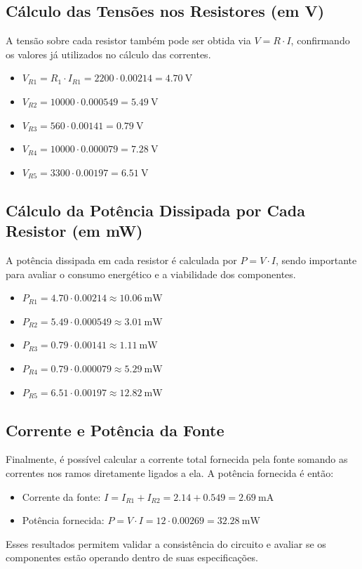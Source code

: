 \subsection{Cálculo das Tensões nos Resistores (em V)}

A tensão sobre cada resistor também pode ser obtida via \(V = R \cdot I\),
confirmando os valores já utilizados no cálculo das correntes.

\begin{itemize}
  \item \(V_{R1} = R_1 \cdot I_{R1} = 2200 \cdot 0.00214 = \SI{4.70}{\volt}\)
  \item \(V_{R2} = 10000 \cdot 0.000549 = \SI{5.49}{\volt}\)
  \item \(V_{R3} = 560 \cdot 0.00141 = \SI{0.79}{\volt}\)
  \item \(V_{R4} = 10000 \cdot 0.000079 = \SI{7.28}{\volt}\)
  \item \(V_{R5} = 3300 \cdot 0.00197 = \SI{6.51}{\volt}\)
\end{itemize}

\subsection{Cálculo da Potência Dissipada por Cada Resistor (em mW)}

A potência dissipada em cada resistor é calculada por \(P = V \cdot I\), sendo
importante para avaliar o consumo energético e a viabilidade dos componentes.

\begin{itemize}
  \item \(P_{R1} = 4.70 \cdot 0.00214 \approx \SI{10.06}{\milli\watt}\)
  \item \(P_{R2} = 5.49 \cdot 0.000549 \approx \SI{3.01}{\milli\watt}\)
  \item \(P_{R3} = 0.79 \cdot 0.00141 \approx \SI{1.11}{\milli\watt}\)
  \item \(P_{R4} = 0.79 \cdot 0.000079 \approx \SI{5.29}{\milli\watt}\)
  \item \(P_{R5} = 6.51 \cdot 0.00197 \approx \SI{12.82}{\milli\watt}\)
\end{itemize}

\subsection{Corrente e Potência da Fonte}

Finalmente, é possível calcular a corrente total fornecida pela fonte somando as
correntes nos ramos diretamente ligados a ela. A potência fornecida é então:

\begin{itemize}
  \item Corrente da fonte: \(I = I_{R1} + I_{R2} = 2.14 + 0.549 = \SI{2.69}{\milli\ampere}\)
  \item Potência fornecida: \(P = V \cdot I = 12 \cdot 0.00269 = \SI{32.28}{\milli\watt}\)
\end{itemize}

Esses resultados permitem validar a consistência do circuito e avaliar se os
componentes estão operando dentro de suas especificações.